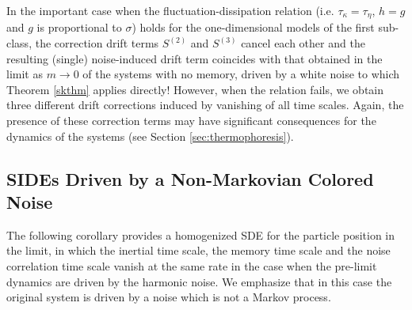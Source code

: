\begin{remark} \label{fdt_impcase} In the important case when the fluctuation-dissipation relation (i.e. $\tau_{\kappa} = \tau_{\eta}$, $h = g$ and $g$ is proportional to  $\sigma$) holds for the one-dimensional models of the first sub-class, the correction drift terms $S^{(2)}$ and $S^{(3)}$ cancel each other and the resulting (single) noise-induced drift term coincides with that obtained in the limit as $m \to 0$ of the systems with no memory, driven by a white noise to which Theorem \ref{skthm} applies directly! However, when the relation fails, we obtain three different drift corrections induced by vanishing of all time scales. Again, the presence of these correction terms may have significant consequences for the dynamics of the systems (see Section \ref{sec:thermophoresis}).
\end{remark}


\subsection{SIDEs Driven by a Non-Markovian Colored Noise}



The following corollary provides a homogenized SDE for the particle position in the limit, in which the inertial time scale, the memory time scale and the noise correlation time scale vanish at the same rate in the case when the pre-limit dynamics are driven by the  harmonic noise.  We emphasize that in this case the original system is driven by a noise which is not a Markov process. 

